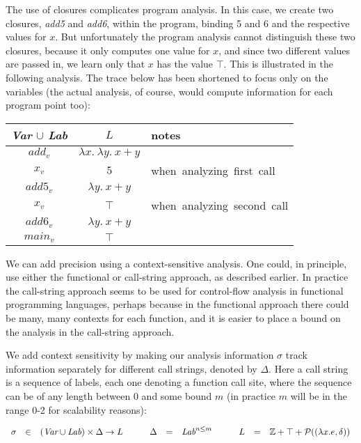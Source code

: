 \documentclass[11pt]{article}
\def\Integer{\mathbb{Z}}
\def\tablespace{\vspace{2ex}}
\begin{document}
The use of closures complicates program analysis.  In this case, we create two closures, \textit{add5} and \textit{add6}, within the program, binding 5 and 6 and the respective values for $x$.  But unfortunately the program analysis cannot distinguish these two closures, because it only computes one value for $x$, and since two different values are passed in, we learn only that $x$ has the value $\top$. This is illustrated in the following analysis.  The trace below has been shortened to focus only on the variables (the actual analysis, of course, would compute information for each program point too):

\tablespace
\begin{tabular}{c | c | l}

\textit{Var} $\cup$ \textit{Lab} & $L$ & notes \\
\hline
$add_v$ & $\lambda x .~ \lambda y .~ x + y$ \\
$x_v$ & $5$ & \mbox{when analyzing first call} \\
$add5_v$ & $\lambda y .~ x + y$ \\
$x_v$ & $\top$ & \mbox{when analyzing second call} \\
$add6_v$ & $\lambda y .~ x + y$ \\
$main_v$ & $\top$ \\
\end{tabular}
\tablespace

We can add precision using a context-sensitive analysis.  One could, in principle, use either the functional or call-string approach, as described earlier.  In practice the call-string approach seems to be used for control-flow analysis in functional programming languages, perhaps because in the functional approach there could be many, many contexts for each function, and it is easier to place a bound on the analysis in the call-string approach.

We add context sensitivity by making our analysis information $\sigma$ track information separately for different call strings, denoted by $\Delta$.  Here a call string is a sequence of labels, each one denoting a function call site, where the sequence can be of any length between 0 and some bound $m$ (in practice $m$ will be in the range 0-2 for scalability reasons):

\[
\begin{array}{lllllllllll}

\sigma & \in & (\textit{Var} \cup \textit{Lab}) \cross \Delta \rightarrow L & ~~~ &
\Delta & = & \textit{Lab}^{n \leq m} & ~~~ &
 L  & = & \Integer + \top + \mathcal{P}((\lambda x . e, \delta))
\end{array}
\]
\end{document}
